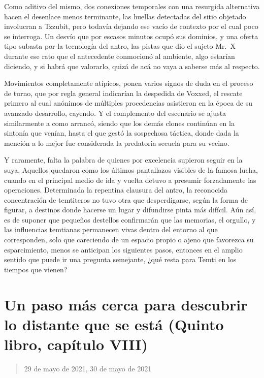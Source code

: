 \documentclass[
]{book}
\begin{document}
Como aditivo del mismo, dos conexiones temporales con una resurgida alternativa hacen el desenlace menos terminante, las huellas detectadas del sitio objetado involucran a Tzzubit, pero todavía dejando ese vacío de contexto por el cual poco se interroga. Un desvío que por escasos minutos ocupó sus dominios, y una oferta tipo subasta por la tecnología del antro, las pistas que dio el sujeto Mr.~X durante ese rato que el antecedente conmocionó al ambiente, algo estarían diciendo, y si habrá que valorarlo, quizá de acá no vaya a saberse más al respecto.

Movimientos completamente atípicos, ponen varios signos de duda en el proceso de turno, que por regla general indicarían la despedida de Voxxed, el rescate primero al cual anónimos de múltiples procedencias asistieron en la época de su avanzado desarrollo, cayendo. Y el complemento del escenario se ajusta similarmente a como arrancó, siendo que los demás clones continúan en la sintonía que venían, hasta el que gestó la sospechosa táctica, donde dada la mención a lo mejor fue considerada la predatoria secuela para su vecino.

Y raramente, falta la palabra de quienes por excelencia supieron seguir en la suya. Aquellos quedaron como los últimos pantallazos visibles de la famosa lucha, cuando en el principal medio de ida y vuelta detuvo a presumir forzadamente las operaciones. Determinada la repentina clausura del antro, la reconocida concentración de temtiteros no tuvo otra que desperdigarse, según la forma de figurar, a destinos donde hacerse un lugar y difundirse pinta más difícil. Aún así, es de suponer que pequeños destellos confirmarán que las memorias, el orgullo, y las influencias temtianas permanecen vivas dentro del entorno al que corresponden, solo que careciendo de un espacio propio o ajeno que favorezca su esparcimiento, menos se anticipan los siguientes pasos, entonces en el amplio sentido que puede ir una pregunta semejante, ¿qué resta para Temti en los tiempos que vienen?

\hypertarget{un-paso-muxe1s-cerca-para-descubrir-lo-distante-que-se-estuxe1-quinto-libro-capuxedtulo-viii}{%
\section{Un paso más cerca para descubrir lo distante que se está (Quinto libro, capítulo VIII)}\label{un-paso-muxe1s-cerca-para-descubrir-lo-distante-que-se-estuxe1-quinto-libro-capuxedtulo-viii}}

\begin{quote}
29 de mayo de 2021, 30 de mayo de 2021
\end{quote}
\end{document}
